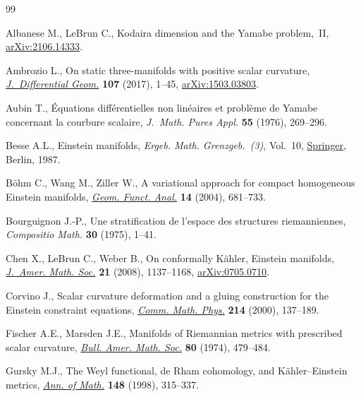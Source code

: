 \documentclass[10pt,a4paper]{amsart}
\numberwithin{equation}{section}
\begin{document}
\begin{thebibliography}{99}
\footnotesize\itemsep=0pt

Albanese M., LeBrun C., Kodaira dimension and the {Y}amabe problem,~{II},
 \href{https://arxiv.org/abs/2106.14333}{arXiv:2106.14333}.

Ambrozio L., On static three-manifolds with positive scalar curvature,
 \href{https://doi.org/10.4310/jdg/1505268028}{\textit{J.~Differential Geom.}} \textbf{107} (2017), 1--45,
 \href{https://arxiv.org/abs/1503.03803}{arXiv:1503.03803}.

Aubin T., \'Equations diff\'erentielles non lin\'eaires et probl\`eme de
 {Y}amabe concernant la courbure scalaire, \textit{J.~Math. Pures Appl.}
 \textbf{55} (1976), 269--296.

Besse A.L., Einstein manifolds, \textit{Ergeb. Math. Grenzgeb.~(3)}, Vol.~10,
 \href{https://doi.org/10.1007/978-3-540-74311-8}{Springer}, Berlin, 1987.

B\"ohm C., Wang M., Ziller W., A variational approach for compact homogeneous
 {E}instein manifolds, \href{https://doi.org/10.1007/s00039-004-0471-x}{\textit{Geom. Funct. Anal.}} \textbf{14} (2004),
 681--733.

Bourguignon J.-P., Une stratification de l'espace des structures riemanniennes,
 \textit{Compositio Math.} \textbf{30} (1975), 1--41.

Chen X., LeBrun C., Weber B., On conformally {K}\"ahler, {E}instein manifolds,
 \href{https://doi.org/10.1090/S0894-0347-08-00594-8}{\textit{J.~Amer. Math. Soc.}} \textbf{21} (2008), 1137--1168,
 \href{https://arxiv.org/abs/0705.0710}{arXiv:0705.0710}.

Corvino J., Scalar curvature deformation and a gluing construction for the
 {E}instein constraint equations, \href{https://doi.org/10.1007/PL00005533}{\textit{Comm. Math. Phys.}} \textbf{214}
 (2000), 137--189.

Fischer A.E., Marsden J.E., Manifolds of {R}iemannian metrics with prescribed
 scalar curvature, \href{https://doi.org/10.1090/S0002-9904-1974-13457-9}{\textit{Bull. Amer. Math. Soc.}} \textbf{80} (1974),
 479--484.

Gursky M.J., The {W}eyl functional, de {R}ham cohomology, and
 {K}\"ahler--{E}instein metrics, \href{https://doi.org/10.2307/120996}{\textit{Ann. of Math.}} \textbf{148} (1998),
 315--337.


\end{thebibliography}
\end{document}

